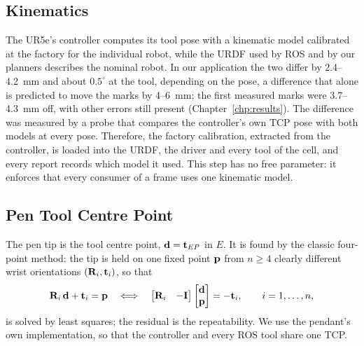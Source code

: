 \subsection{Kinematics}
\label{sec:cal_kin}
The UR5e's controller computes its tool pose with a kinematic model calibrated at the factory
for the individual robot, while the URDF used by ROS and by our planners describes the nominal
robot. In our application the two differ by 2.4--4.2~mm and about $0.5^\circ$ at the tool,
depending on the pose, a difference that alone is predicted to move the marks by 4--6~mm; the
first measured marks were 3.7--4.3~mm off, with other errors still present
(Chapter~\ref{chp:results}).
The difference was measured by a probe that compares the controller's own TCP pose with both
models at every pose. Therefore, the factory calibration, extracted from the controller, is
loaded into the URDF, the driver and every tool of the cell, and every report records which
model it used. This step has no free parameter: it enforces that every consumer of a frame uses
one kinematic model.

\subsection{Pen Tool Centre Point}
\label{sec:cal_tcp}
The pen tip is the tool centre point, $\mathbf{d}=\mathbf{t}_{EP}$ in $E$. It is found by the
classic four-point method: the tip is held on one fixed point $\mathbf{p}$ from $n\ge4$ clearly
different wrist orientations $(\mathbf{R}_i,\mathbf{t}_i)$, so that
\begin{equation}
\mathbf{R}_i\,\mathbf{d}+\mathbf{t}_i=\mathbf{p}
\quad\Longleftrightarrow\quad
\begin{bmatrix}\mathbf{R}_i & -\mathbf{I}\end{bmatrix}
\begin{bmatrix}\mathbf{d}\\ \mathbf{p}\end{bmatrix}=-\mathbf{t}_i,\qquad i=1,\dots,n,
\label{eq:tcp_4pt}
\end{equation}
is solved by least squares; the residual is the repeatability. We use the pendant's own
implementation, so that the controller and every ROS tool share one TCP.

